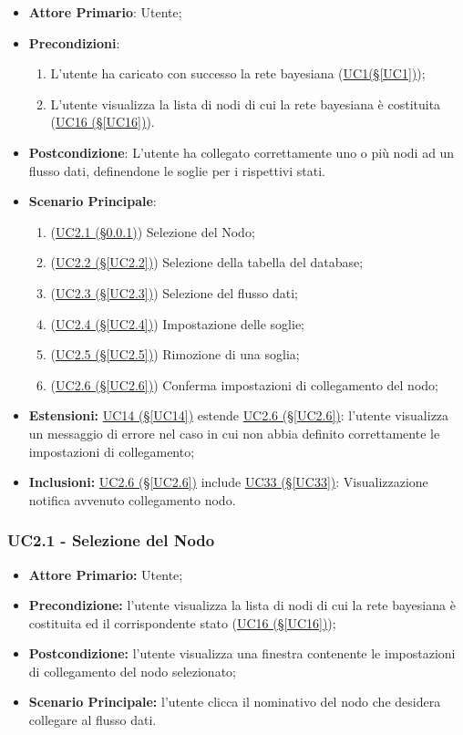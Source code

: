\begin{itemize}
\item \textbf{Attore Primario}: Utente;
\item \textbf{Precondizioni}:
\begin{enumerate}
	\item L'utente ha caricato con successo la rete bayesiana (\hyperref[UC1]{UC1(§\ref*{UC1})});
	\item L'utente visualizza la lista di nodi di cui la rete bayesiana è costituita	(\hyperref[UC16]{UC16 (§\ref*{UC16})}).
\end{enumerate}
\item \textbf{Postcondizione}: L'utente ha collegato correttamente uno o più nodi ad un flusso dati, definendone le soglie per i rispettivi stati.
\item \textbf{Scenario Principale}:
 \begin{enumerate}
 \item (\hyperref[UC2.1]{UC2.1 (§\ref*{UC2.1})}) Selezione del Nodo;
 \item (\hyperref[UC2.2]{UC2.2 (§\ref*{UC2.2})}) Selezione della tabella del database;
 \item (\hyperref[UC2.3]{UC2.3 (§\ref*{UC2.3})}) Selezione del flusso dati;
 \item (\hyperref[UC2.4]{UC2.4 (§\ref*{UC2.4})}) Impostazione delle soglie;
 \item (\hyperref[UC2.5]{UC2.5 (§\ref*{UC2.5})}) Rimozione di una soglia;
 \item (\hyperref[UC2.6]{UC2.6 (§\ref*{UC2.6})}) Conferma impostazioni di collegamento del nodo;
 \end{enumerate}
\item \textbf{Estensioni:} \hyperref[UC14]{UC14 (§\ref*{UC14})} estende \hyperref[UC2.6]{UC2.6 (§\ref*{UC2.6})}: l'utente visualizza un messaggio di errore nel caso in cui non abbia definito correttamente le impostazioni di collegamento;
\item \textbf{Inclusioni:} \hyperref[UC2.6]{UC2.6 (§\ref*{UC2.6})} include \hyperref[UC33]{UC33 (§\ref*{UC33})}: Visualizzazione notifica avvenuto collegamento nodo.
\end{itemize}

\pagebreak

\subsubsection{UC2.1 - Selezione del Nodo}\label{UC2.1}
\begin{itemize}
\item \textbf{Attore Primario:} Utente;
\item \textbf{Precondizione:} l'utente visualizza la lista di nodi di cui la rete bayesiana è costituita ed il 	corrispondente stato (\hyperref[UC16]{UC16 (§\ref*{UC16})});
\item \textbf{Postcondizione:} l'utente visualizza una finestra contenente le impostazioni di collegamento del nodo selezionato;
\item \textbf{Scenario Principale:} l'utente clicca il nominativo del nodo che desidera collegare al flusso dati.
\end{itemize}

